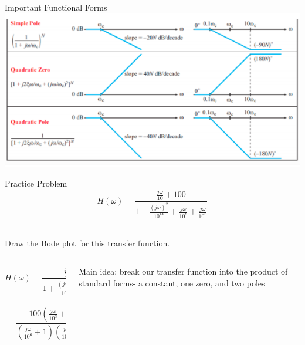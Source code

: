    \begin{frame}{Important Functional Forms}
        \includegraphics[scale=0.75]{./images/important-functional-forms-2.png}
    \end{frame}
    \begin{frame}{Practice Problem}
        $$H(\omega) = \frac{\frac{j\omega}{10} + 100}{1 + \frac{(j\omega)^2}{10^14} + \frac{j\omega}{10^8} + \frac{j\omega}{10^6}}$$\\
        \begin{center}
            Draw the Bode plot for this transfer function.
        \end{center}
    \end{frame}
    \begin{frame}{}
        \begin{columns}
            \begin{column}{0.5\textwidth}
                $$H(\omega) = \frac{\frac{j\omega}{10} + 100}{1 + \frac{(j\omega)^2}{10^14} + \frac{j\omega}{10^8} + \frac{j\omega}{10^6}}$$\\
                $$=\frac{100(\frac{j\omega}{10^3}+1)}{(\frac{j\omega}{10^6}+1)(\frac{j\omega}{10^8}+1)}
                $$
            \end{column}
            \begin{column}{0.5\textwidth}
                Main idea: break our transfer function into the product of standard forms- a constant, one zero, and two poles
            \end{column}
        \end{columns}
        
    \end{frame}
